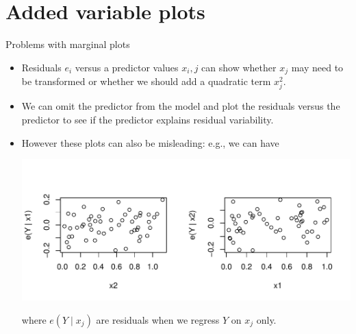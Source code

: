 \documentclass{beamer}
\begin{document}
\section{Added variable plots}

\begin{frame}{Problems with marginal plots}
\begin{small}
\begin{itemize}
\item Residuals $e_i$ versus a predictor values $x_i,j$ can show whether $x_j$ may need to be transformed or whether we should add a quadratic term $x_j^2$.
\item\pause We can omit the predictor  from the model and plot the residuals versus the predictor to see if the predictor explains residual variability.
\item\pause However these plots can also be misleading: \pause e.g., we can have
\vspace{-5pt}
\begin{center}
    \includegraphics[height=.3\textheight]{plots/res-xj.pdf}
\end{center}
where $e(Y\mid x_j)$ are residuals when we regress $Y$ on $x_j$ only.
\end{itemize}
\end{small}
\end{frame}
\end{document}
